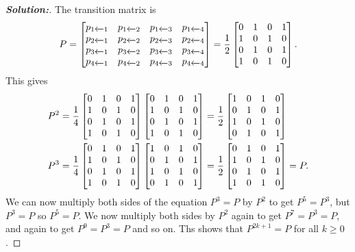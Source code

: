 \documentclass[a4paper]{amsart}
\theoremstyle{definition}
\newenvironment{solution}{\begin{proof}[\textbf{Solution:}] \vphantom{u}}{\end{proof}}
\begin{document}
\begin{solution}
 The transition matrix is
 \[ P =
     \left[\begin{matrix} 
      p_{1\xleftarrow{}1} & p_{1\xleftarrow{}2} & p_{1\xleftarrow{}3} & p_{1\xleftarrow{}4} \\
      p_{2\xleftarrow{}1} & p_{2\xleftarrow{}2} & p_{2\xleftarrow{}3} & p_{2\xleftarrow{}4} \\
      p_{3\xleftarrow{}1} & p_{3\xleftarrow{}2} & p_{3\xleftarrow{}3} & p_{3\xleftarrow{}4} \\
      p_{4\xleftarrow{}1} & p_{4\xleftarrow{}2} & p_{4\xleftarrow{}3} & p_{4\xleftarrow{}4}
     \end{matrix}\right] = 
     \frac{1}{2}
     \left[\begin{matrix} 
      0 & 1 & 0 & 1 \\
      1 & 0 & 1 & 0 \\
      0 & 1 & 0 & 1 \\
      1 & 0 & 1 & 0
     \end{matrix}\right].
 \]
 This gives
 \begin{align*}
  P^2 &= \frac{1}{4}
     \left[\begin{matrix} 
      0 & 1 & 0 & 1 \\
      1 & 0 & 1 & 0 \\
      0 & 1 & 0 & 1 \\
      1 & 0 & 1 & 0
     \end{matrix}\right]
     \left[\begin{matrix} 
      0 & 1 & 0 & 1 \\
      1 & 0 & 1 & 0 \\
      0 & 1 & 0 & 1 \\
      1 & 0 & 1 & 0
     \end{matrix}\right] 
     = \frac{1}{2} 
     \left[\begin{matrix}
      1 & 0 & 1 & 0 \\
      0 & 1 & 0 & 1 \\
      1 & 0 & 1 & 0 \\
      0 & 1 & 0 & 1
     \end{matrix}\right] \\
  P^3 &= \frac{1}{4}
     \left[\begin{matrix} 
      0 & 1 & 0 & 1 \\
      1 & 0 & 1 & 0 \\
      0 & 1 & 0 & 1 \\
      1 & 0 & 1 & 0
     \end{matrix}\right]
     \left[\begin{matrix}
      1 & 0 & 1 & 0 \\
      0 & 1 & 0 & 1 \\
      1 & 0 & 1 & 0 \\
      0 & 1 & 0 & 1
     \end{matrix}\right] 
     = \frac{1}{2}
     \left[\begin{matrix} 
      0 & 1 & 0 & 1 \\
      1 & 0 & 1 & 0 \\
      0 & 1 & 0 & 1 \\
      1 & 0 & 1 & 0
     \end{matrix}\right] = P.
 \end{align*}
 We can now multiply both sides of the equation $P^3=P$ by $P^2$ to
 get $P^5=P^3$, but $P^3=P$ so $P^5=P$.  We now multiply both sides by
 $P^2$ again to get $P^7=P^3=P$, and again to get $P^9=P^3=P$ and so
 on.  Ths shows that $P^{2k+1}=P$ for all $k\geq 0$.


\end{solution}
\end{document}
